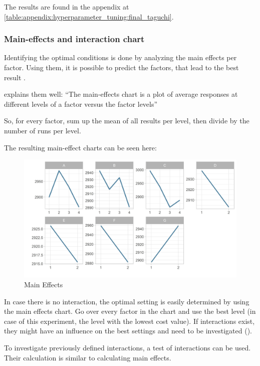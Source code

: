 The results are found in the appendix at \ref{table:appendix:hyperparameter_tuning:final_taguchi}.

\subsubsection{Main-effects and interaction chart}
Identifying the optimal conditions is done by analyzing the main effects per factor. Using them, it is possible to predict the factors, that lead to the best result \cite{roy_primer_1990}.

\cite{yang_design_2009} explains them well: 
\enquote{The main-effects chart is a plot of average responses at different levels of a factor versus the factor levels}

So, for every factor, sum up the mean of all results per level, then divide by the number of runs per level.


The resulting main-effect charts can be seen here:
\begin{figure}[ht] 
	\label{figure:taguchi:main_effects}
	\includegraphics[width=1\linewidth]{simulations/taguchi/plots/main_effects}
	\caption{Main Effects}
\end{figure}


In case there is no interaction, the optimal setting is easily determined by using the main effects chart. Go over every factor in the chart and use the best level (in case of this experiment, the level with the lowest cost value). If interactions exist, they might have an influence on the best settings and need to be investigated (\cite{yang_design_2009}).

To investigate previously defined interactions, a test of interactions can be used. Their calculation is similar to calculating main effects.

